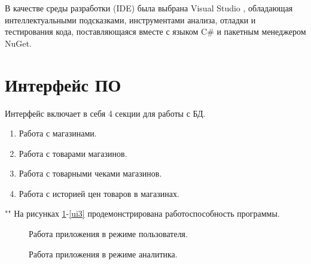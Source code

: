 \documentclass[a4paper,14pt]{extreport}
\begin{document}
В качестве среды разработки (IDE) была выбрана Visual Studio \cite{vs}, обладающая интеллектуальными подсказками, инструментами анализа, отладки и тестирования кода, поставляющаяся вместе с языком C\# и пакетным менеджером NuGet.

\section{Интерфейс ПО}

Интерфейс включает в себя 4 секции для работы с БД.

\begin{enumerate}
	\setlength\itemsep{0.01em}
	\item Работа с магазинами.
	\item Работа с товарами магазинов.
	\item Работа с товарными чеками магазинов.
	\item Работа с историей цен товаров в магазинах.
\end{enumerate}

""\newline\indent
На рисунках \ref{ui1}-\ref{ui3} продемонстрирована работоспособность программы.
\captionsetup{singlelinecheck = false, justification=centering}
\begin{figure}[H]
	\centering
	\caption{Работа приложения в режиме пользователя.}
	\label{ui1}
\end{figure}

\begin{figure}[H]
	\centering
	\caption{Работа приложения в режиме аналитика.}
	\label{ui2}
\end{figure}
\end{document}

